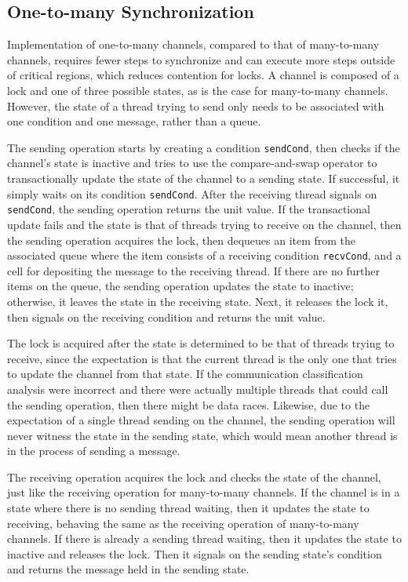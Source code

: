 \documentclass[letterpaper, 11pt]{extarticle}
\begin{document}
\subsection{One-to-many Synchronization}

Implementation of one-to-many channels, compared to that of many-to-many channels,
requires fewer
steps to synchronize and can execute more steps outside of critical regions, which reduces
contention for locks. A channel is composed of a lock and one of three possible states, as is
the case for many-to-many channels.  However, the state of a thread trying to send only needs
to be associated with one condition and one message, rather than a queue.  

The sending operation starts by creating a condition \lstinline{sendCond}, then checks
if the channel's state is inactive and tries to use the
compare-and-swap operator to transactionally update the state of
the channel to a sending state.
If successful, it simply waits on its condition \lstinline{sendCond}.
After the receiving thread signals on \lstinline{sendCond}, the sending operation returns the unit value.
If the transactional update fails and the state is
that of threads trying to receive on the channel, then the sending operation acquires the lock,
then dequeues an item from the associated queue where the item consists of a receiving condition \lstinline{recvCond},
and a cell for depositing the message to the receiving thread.
If there are no further items on the queue, the sending operation updates the state to inactive; otherwise, it
leaves the state in the receiving state.
Next, it releases the lock it, then signals on the receiving condition and returns the unit value.

The lock is acquired after the state is determined to be that of
threads trying to receive, since the expectation is that the current thread is the only one
that tries to update the channel from that state.  If the communication classification analysis were
incorrect and there were actually multiple threads that could call the sending operation,
then there might be data races.  Likewise, due to the expectation of a single thread
sending on the channel, the sending operation will never witness the state in the sending state,
which would mean another thread is in the process of sending a message.

The receiving operation acquires the lock and checks
the state of the channel, just like the receiving operation for many-to-many channels.
If the channel is in a state where there is no sending thread waiting,
then it updates the state to receiving, behaving the same as the receiving operation of many-to-many channels.
If there is already a sending thread waiting, then it updates the state to inactive and
releases the lock. Then it signals on the sending state's condition and
returns the message held in the sending state.
\end{document}
